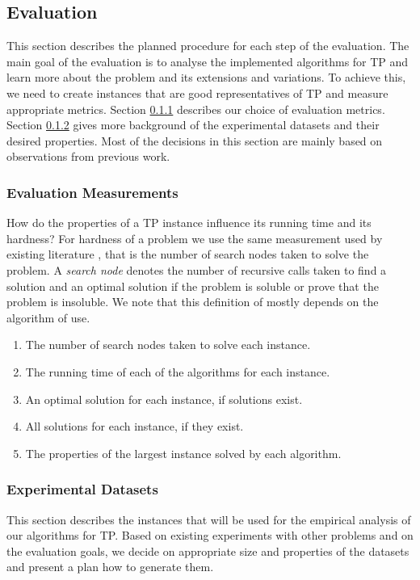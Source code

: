 \documentclass{mprop}
\theoremstyle{definition}
\begin{document}
\subsection{Evaluation}
\label{sec:evaluation}

This section describes the planned procedure for each step of the evaluation. The main goal of the evaluation is to analyse the implemented algorithms for TP and learn more about the problem and its extensions and variations. To achieve this, we need to create instances that are good representatives of TP and measure appropriate metrics. Section \ref{sec:evaluationgoals} describes our choice of evaluation metrics. Section \ref{sec:datasets} gives more background of the experimental datasets and their desired properties. Most of the decisions in this section are mainly based on observations from previous work.

\subsubsection{Evaluation Measurements}
\label{sec:evaluationgoals}

How do the properties of a TP instance influence its running time and its hardness? For hardness of a problem we use the same measurement used by existing literature \citep{McCreesh16}, that is the number of search nodes taken to solve the problem. A \textit{search node} denotes the number of recursive calls taken to find a solution and an optimal solution if the problem is soluble or prove that the problem is insoluble. We note that this definition of mostly depends on the algorithm of use.

\begin{enumerate}
\item The number of search nodes taken to solve each instance.
\item The running time of each of the algorithms for each instance.
\item An optimal solution for each instance, if solutions exist.
\item All solutions for each instance, if they exist.
\item The properties of the largest instance solved by each algorithm.
\end{enumerate}

\subsubsection{Experimental Datasets}
\label{sec:datasets}
This section describes the instances that will be used for the empirical analysis of our algorithms for TP. Based on existing experiments with other problems and on the evaluation goals, we decide on appropriate size and properties of the datasets and present a plan how to generate them.
\end{document}
